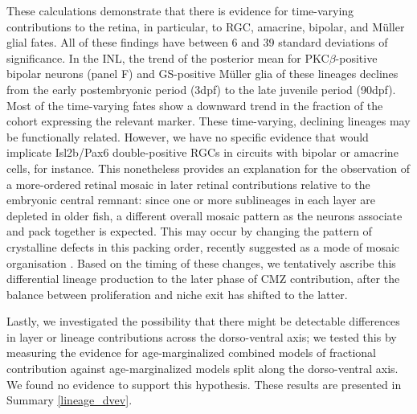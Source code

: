 \documentclass{ut-thesis}
\begin{document}
\begin{NoHyper}
These calculations demonstrate that there is evidence for time-varying contributions to the retina, in particular, to RGC, amacrine, bipolar, and M{\"u}ller glial fates. All of these findings have between 6 and 39 standard deviations of significance. In the INL, the trend of the posterior mean for PKC$\beta$-positive bipolar neurons (panel F) and GS-positive M{\"u}ller glia of these lineages declines from the early postembryonic period (3dpf) to the late juvenile period (90dpf). Most of the time-varying fates show a downward trend in the fraction of the cohort expressing the relevant marker. These time-varying, declining lineages may be functionally related. However, we have no specific evidence that would implicate Isl2b/Pax6 double-positive RGCs in circuits with bipolar or amacrine cells, for instance. This nonetheless provides an explanation for the observation of a more-ordered retinal mosaic in later retinal contributions relative to the embryonic central remnant: since one or more sublineages in each layer are depleted in older fish, a different overall mosaic pattern as the neurons associate and pack together is expected. This may occur by changing the pattern of crystalline defects in this packing order, recently suggested as a mode of mosaic organisation \cite{Nunley2019}. Based on the timing of these changes, we tentatively ascribe this differential lineage production to the later phase of CMZ contribution, after the balance between proliferation and niche exit has shifted to the latter.

Lastly, we investigated the possibility that there might be detectable differences in layer or lineage contributions across the dorso-ventral axis; we tested this by measuring the evidence for age-marginalized combined models of fractional contribution against age-marginalized models split along the dorso-ventral axis. We found no evidence to support this hypothesis. These results are presented in Summary \autoref{lineage_dvev}.

\FloatBarrier


\end{NoHyper}
\end{document}
